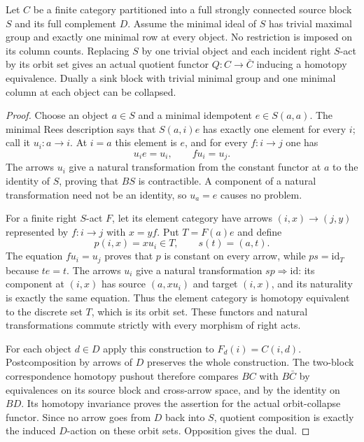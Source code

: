 \begin{lemma}
\label{C:one-row-source-block-collapse}
Let $C$ be a finite category partitioned into a full strongly
connected source block $S$ and its full complement $D$.
Assume the minimal ideal of $S$ has trivial maximal group and
exactly one minimal row at every object. No restriction is
imposed on its column counts. Replacing $S$ by one trivial
object and each incident right $S$-act by its orbit set gives
an actual quotient functor $Q:C\to\bar C$ inducing a homotopy
equivalence. Dually a sink block with trivial minimal group
and one minimal column at each object can be collapsed.
\end{lemma}
\begin{proof}
Choose an object $a\in S$ and a minimal idempotent
$e\in S(a,a)$. The minimal Rees description says that
$S(a,i)e$ has exactly one element for every $i$; call it
$u_i:a\to i$. At $i=a$ this element is $e$, and for every
$f:i\to j$ one has
\[
 u_i e=u_i,\qquad f u_i=u_j.
\]
The arrows $u_i$ give a natural transformation from the constant
functor at $a$ to the identity of $S$, proving that $BS$ is
contractible. A component of a natural transformation need not
be an identity, so $u_a=e$ causes no problem.

For a finite right $S$-act $F$, let its element category have
arrows $(i,x)\to(j,y)$ represented by $f:i\to j$ with $x=yf$.
Put $T=F(a)e$ and define
\[
 p(i,x)=x u_i\in T,\qquad s(t)=(a,t).
\]
The equation $f u_i=u_j$ proves that $p$ is constant on every
arrow, while $ps=\mathrm{id}_T$ because $te=t$.
The arrows $u_i$ give a natural transformation
$sp\Rightarrow\mathrm{id}$: its component at $(i,x)$ has
source $(a,xu_i)$ and target $(i,x)$, and its naturality is
exactly the same equation. Thus the element category is
homotopy equivalent to the discrete set $T$, which is its
orbit set. These functors and natural transformations commute
strictly with every morphism of right acts.

For each object $d\in D$ apply this construction to
$F_d(i)=C(i,d)$. Postcomposition by arrows of $D$ preserves
the whole construction. The two-block correspondence homotopy
pushout therefore compares $BC$ with $B\bar C$ by equivalences
on its source block and cross-arrow space, and by the identity
on $BD$. Its homotopy invariance proves the assertion for the
actual orbit-collapse functor. Since no arrow goes from $D$
back into $S$, quotient composition is exactly the induced
$D$-action on these orbit sets. Opposition gives the dual.
\end{proof}

